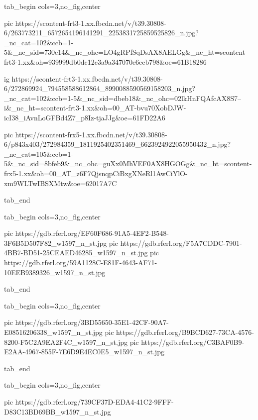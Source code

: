  
 
 
 
 

\ifcmt

  tab_begin cols=3,no_fig,center

    pic https://scontent-frt3-1.xx.fbcdn.net/v/t39.30808-6/263773211_6572654196141291_2253831725859525826_n.jpg?_nc_cat=102&ccb=1-5&_nc_sid=730e14&_nc_ohc=LO4gRPfSqDsAX8AELGg&_nc_ht=scontent-frt3-1.xx&oh=939999db0dc12c3a9a347070e6ecb798&oe=61B18286
  
    ig https://scontent-frt3-1.xx.fbcdn.net/v/t39.30808-6/272869924_794558588612864_8990088590569158203_n.jpg?_nc_cat=102&ccb=1-5&_nc_sid=dbeb18&_nc_ohc=02lkHnFQAfcAX8S7--i&_nc_ht=scontent-frt3-1.xx&oh=00_AT-bvu70XobDJW-icI38_iAvnLoGFBd4Z7_p8Iz-tjaJJg&oe=61FD22A6
  
    pic https://scontent-frx5-1.xx.fbcdn.net/v/t39.30808-6/p843x403/272984359_1811925402351469_6623924922055950432_n.jpg?_nc_cat=105&ccb=1-5&_nc_sid=8bfeb9&_nc_ohc=guXx0MhVEF0AX8HGOGg&_nc_ht=scontent-frx5-1.xx&oh=00_AT_z6F7QjsnqpCiBxgXNeRl1AwCiYlO-xm9WLTwIBSXMtw&oe=62017A7C

  tab_end

  tab_begin cols=3,no_fig,center

    pic https://gdb.rferl.org/EF60F686-91A5-4EF2-B548-3F6B5D507F82_w1597_n_st.jpg
    pic https://gdb.rferl.org/F5A7CDDC-7901-4BB7-BD51-25CEAED46285_w1597_n_st.jpg
    pic https://gdb.rferl.org/59A1128C-E81F-4643-AF71-10EEB9389326_w1597_n_st.jpg

  tab_end

  tab_begin cols=3,no_fig,center

    pic https://gdb.rferl.org/3BD55650-35E1-42CF-90A7-E08516206338_w1597_n_st.jpg
    pic https://gdb.rferl.org/B9BCD627-73CA-4576-8200-F5C2A9EA2F4C_w1597_n_st.jpg
    pic https://gdb.rferl.org/C3BAF0B9-E2AA-4967-855F-7E6D9E4EC0E5_w1597_n_st.jpg

  tab_end

  tab_begin cols=3,no_fig,center

    pic https://gdb.rferl.org/739CF37D-EDA4-41C2-9FFF-D83C13BD69BB_w1597_n_st.jpg

